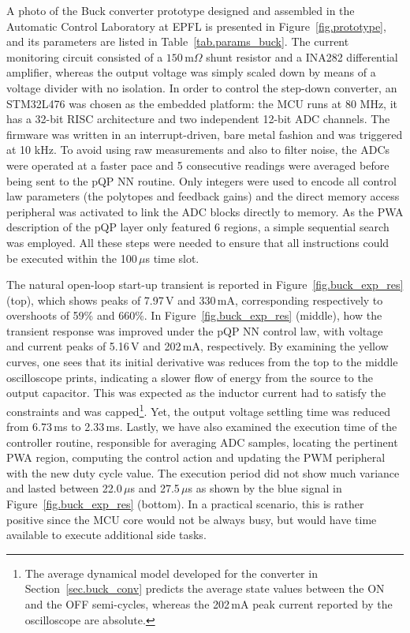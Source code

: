 A photo of the Buck converter prototype designed and assembled in the Automatic Control Laboratory at EPFL is presented in Figure~\ref{fig.prototype}, and its parameters are listed in Table~\ref{tab.params_buck}. The current monitoring circuit consisted of a $150\,$m$\Omega$ shunt resistor and a INA282 differential amplifier, whereas the output voltage was simply scaled down by means of a voltage divider with no isolation. In order to control the step-down converter, an STM32L476 was chosen as the embedded platform: the MCU runs at 80 MHz, it has a 32-bit RISC architecture and two independent 12-bit ADC channels. The firmware was written in an interrupt-driven, bare metal fashion and was triggered at 10 kHz. To avoid using raw measurements and also to filter noise, the ADCs were operated at a faster pace and 5 consecutive readings were averaged before being sent to the pQP NN routine. Only integers were used to encode all control law parameters (the polytopes and feedback gains) and the direct memory access peripheral was activated to link the ADC blocks directly to memory. As the PWA description of the pQP layer only featured 6 regions, a simple sequential search was employed. All these steps were needed to ensure that all instructions could be executed within the 100$\,\mu$s time slot.

The natural open-loop start-up transient is reported in Figure~\ref{fig.buck_exp_res} (top), which shows peaks of 7.97$\,$V and 330$\,$mA, corresponding respectively to overshoots of 59\% and 660\%. In Figure~\ref{fig.buck_exp_res} (middle), how the transient response was improved under the pQP NN control law, with voltage and current peaks of 5.16$\,$V and 202$\,$mA, respectively. By examining the yellow curves, one sees that its initial derivative was reduces from the top to the middle oscilloscope prints, indicating a slower flow of energy from the source to the output capacitor. This was expected as the inductor current had to satisfy the constraints and was capped\footnote{The average dynamical model developed for the converter in Section~\ref{sec.buck_conv} predicts the average state values between the ON and the OFF semi-cycles, whereas the 202$\,$mA peak current reported by the oscilloscope are absolute.}. Yet, the output voltage settling time was reduced from 6.73$\,$ms to 2.33$\,$ms. Lastly, we have also examined the execution time of the controller routine, responsible for averaging ADC samples, locating the pertinent PWA region, computing the control action and updating the PWM peripheral with the new duty cycle value. The execution period did not show much variance and lasted between 22.0$\,\mu$s and 27.5$\,\mu$s as shown by the blue signal in Figure~\ref{fig.buck_exp_res} (bottom). In a practical scenario, this is rather positive since the MCU core would not be always
busy, but would have time available to execute additional side tasks.

